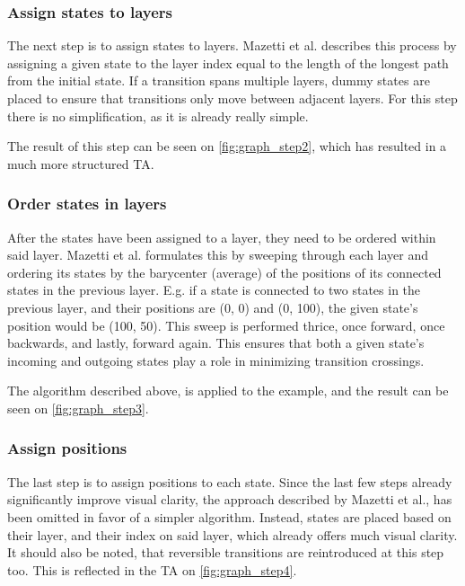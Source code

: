 \begin{center}
    
\end{center}

\subsubsection{Assign states to layers}
The next step is to assign states to layers. Mazetti et al. describes this process by assigning a given state to the layer index equal to the length of the longest path from the initial state. If a transition spans multiple layers, dummy states are placed to ensure that transitions only move between adjacent layers.  For this step there is no simplification, as it is already really simple. \cite{Mazetti2012}

The result of this step can be seen on \cref{fig:graph_step2}, which has resulted in a much more structured TA.

\begin{center}
    
\end{center}

\subsubsection{Order states in layers}
After the states have been assigned to a layer, they need to be ordered within said layer.
Mazetti et al. formulates this by sweeping through each layer and ordering its states by the barycenter (average) of the positions of its connected states in the previous layer.
E.g. if a state is connected to two states in the previous layer, and their positions are (0, 0) and (0, 100), the given state's position would be (100, 50).
This sweep is performed thrice, once forward, once backwards, and lastly, forward again.
This ensures that both a given state's incoming and outgoing states play a role in minimizing transition crossings. \cite{Mazetti2012}

The algorithm described above, is applied to the example, and the result can be seen on \cref{fig:graph_step3}.
\begin{center}
    
\end{center}

\subsubsection{Assign positions}
The last step is to assign positions to each state.
Since the last few steps already significantly improve visual clarity, the approach described by Mazetti et al., has been omitted in favor of a simpler algorithm. Instead, states are placed based on their layer, and their index on said layer, which already offers much visual clarity. It should also be noted, that reversible transitions are reintroduced at this step too. This is reflected in the TA on \cref{fig:graph_step4}.

\begin{center}
    
\end{center}
